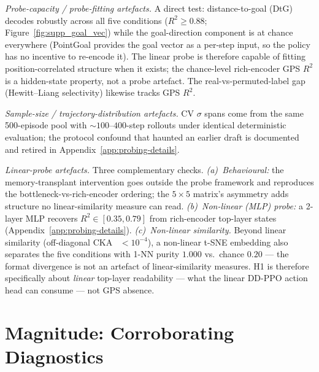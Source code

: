 \documentclass{article}
\begin{document}
\emph{Probe-capacity / probe-fitting artefacts.} A direct test: distance-to-goal (DtG) decodes robustly across all five conditions ($R^2 \geq 0.88$; Figure~\ref{fig:supp_goal_vec}) while the goal-direction component is at chance everywhere (PointGoal provides the goal vector as a per-step input, so the policy has no incentive to re-encode it). The linear probe is therefore capable of fitting position-correlated structure when it exists; the chance-level rich-encoder GPS $R^2$ is a hidden-state property, not a probe artefact. The real-vs-permuted-label gap (Hewitt--Liang selectivity) likewise tracks GPS $R^2$.

\emph{Sample-size / trajectory-distribution artefacts.} CV $\sigma$ spans come from the same 500-episode pool with $\sim 100$--$400$-step rollouts under identical deterministic evaluation; the protocol confound that haunted an earlier draft is documented and retired in Appendix~\ref{app:probing-details}.

\emph{Linear-probe artefacts.} Three complementary checks. \emph{(a)~Behavioural:} the memory-transplant intervention goes outside the probe framework and reproduces the bottleneck-vs-rich-encoder ordering; the $5\times 5$ matrix's asymmetry adds structure no linear-similarity measure can read. \emph{(b)~Non-linear (MLP) probe:} a 2-layer MLP recovers $R^2 \in [0.35, 0.79]$ from rich-encoder top-layer states (Appendix~\ref{app:probing-details}). \emph{(c)~Non-linear similarity.} Beyond linear similarity (off-diagonal CKA~\citep{kornblith2019cka} $< 10^{-4}$), a non-linear t-SNE embedding also separates the five conditions with 1-NN purity $1.000$ vs.\ chance $0.20$ --- the format divergence is not an artefact of linear-similarity measures. H1 is therefore specifically about \emph{linear} top-layer readability --- what the linear DD-PPO action head can consume --- not GPS absence.


\section{Magnitude: Corroborating Diagnostics}
\label{app:magnitude-detail}
\label{app:mine}
\end{document}
